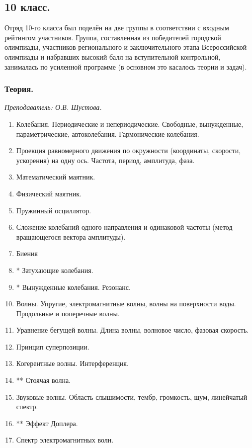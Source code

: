\documentclass[12pt]{article}
\newlength{\h}
\newlength{\x}
\begin{document}
\subsection{10 класс. }
\label{sec:daily10}

Отряд 10-го класса был поделён на две группы в соответствии с входным
рейтингом участников. Группа, составленная из победителей городской
олимпиады, участников регионального и заключительного этапа
Всероссийской олимпиады и набравших высокий балл на вступительной
контрольной, занималась по усиленной программе (в основном это
касалось теории и задач).

\subsubsection{Теория.}
\label{sec:daily10th}

\textit{Преподаватель: О.В. Шустова.}\\

\begin{enumerate}
\item Колебания. Периодические и непериодические. Свободные,
  вынужденные, параметрические, автоколебания. Гармонические
  колебания.
\item Проекция равномерного движения по окружности (координаты,
  скорости, ускорения) на одну ось. Частота, период, амплитуда, фаза.
\item Математический маятник.
\item Физический маятник.
\item Пружинный осциллятор.
\item Сложение колебаний одного направления и одинаковой частоты
  (метод вращающегося вектора амплитуды).
\item Биения
\item * Затухающие колебания.
\item * Вынужденные колебания. Резонанс.
\item Волны. Упругие, электромагнитные волны, волны на поверхности
  воды. Продольные и поперечные волны.
\item Уравнение бегущей волны. Длина волны, волновое число, фазовая скорость.
\item Принцип суперпозиции.
\item Когерентные волны. Интерференция.
\item ** Стоячая волна.
\item Звуковые волны. Область слышимости, тембр, громкость, шум, линейчатый спектр.
\item **  Эффект Доплера.
\item Спектр электромагнитных волн. 
\end{enumerate}
\end{document}
